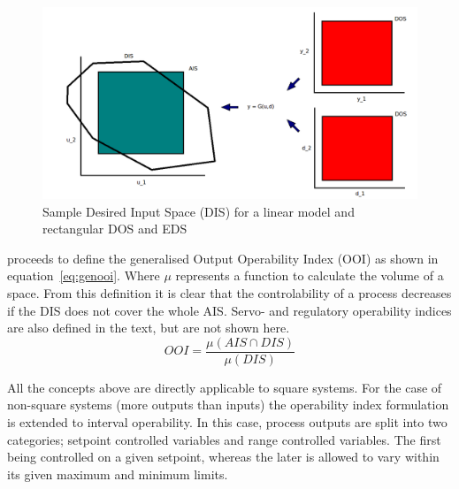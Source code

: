 \begin{figure}[htbp]
  \centering
  \includegraphics[width=\fullwidth]{graph/sample_dis}
  \caption[Sample Desired Input Space]{Sample Desired Input Space (DIS) for
    a linear model and rectangular DOS and EDS}
  \label{fig:sampledis}
\end{figure}

\citet{vinsonphd} proceeds to define the generalised Output Operability Index (OOI) as shown in equation~\ref{eq:genooi}. 
Where $\mu$ represents a function to calculate the volume of a space.
From this definition it is clear that the controlability of a process decreases if the DIS does not cover the whole AIS. 
Servo- and regulatory operability indices are also defined in the text, but are not shown here.
\begin{equation}
  \label{eq:genooi}
     OOI = \frac{\mu(AIS\cap DIS)}{\mu(DIS)}
\end{equation}

All the concepts above are directly applicable to square systems.
For the case of non-square systems (more outputs than inputs) the operability index formulation is extended to interval operability. 
In this case, process outputs are split into two categories; setpoint controlled variables and range controlled variables.
The first being controlled on a given setpoint, whereas the later is allowed to vary within its given maximum and minimum limits.

